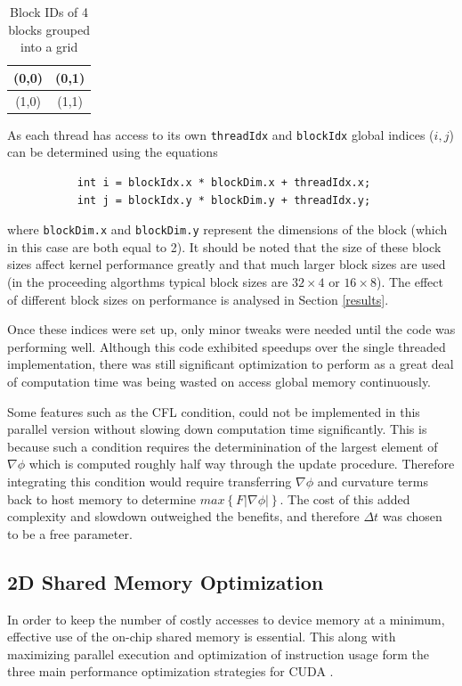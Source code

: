\begin{table}
\begin{center}
  \begin{tabular}{ | c | c |}
    \hline
    (0,0) & (0,1)  \\ \hline
    (1,0) & (1,1)  \\ \hline
  \end{tabular}
\end{center}
\label{table:blocks}\caption{Block IDs of 4 blocks grouped into a grid}
\end{table}

As each thread has access to its own \texttt{threadIdx} and \texttt{blockIdx} global indices ($i,j$) can be determined using the equations

\begin{verbatim}
           int i = blockIdx.x * blockDim.x + threadIdx.x;
           int j = blockIdx.y * blockDim.y + threadIdx.y;
\end{verbatim}

where \texttt{blockDim.x} and \texttt{blockDim.y} represent the dimensions of the block (which in this case are both equal to 2). It should be noted that the size of these block sizes affect kernel performance greatly and that much larger block sizes are used (in the proceeding algorthms typical block sizes are $32\times 4$ or $16 \times 8$). The effect of different block sizes on performance is analysed in Section \ref{results}.

Once these indices were set up, only minor tweaks were needed until the code was performing well. Although this code exhibited speedups over the single threaded implementation, there was still significant optimization to perform as a great deal of computation time was being wasted on access global memory continuously.

Some features such as the CFL condition, could not be implemented in this parallel version without slowing down computation time significantly. This is because such a condition requires the determinination of the largest element of $\nabla\phi$ which is computed roughly half way through the update procedure. Therefore integrating this condition would require transferring $\nabla\phi$ and curvature terms back to host memory to determine $max\left\{F|\nabla\phi|\right\}$. The cost of this added complexity and slowdown outweighed the benefits, and therefore $\Delta t$ was chosen to be a free parameter.

	\subsection{2D Shared Memory Optimization}
In order to keep the number of costly accesses to device memory at a minimum, effective use of the on-chip shared memory is essential. This along with maximizing parallel execution and optimization of instruction usage form the three main performance optimization strategies for CUDA \cite{cuda}.

